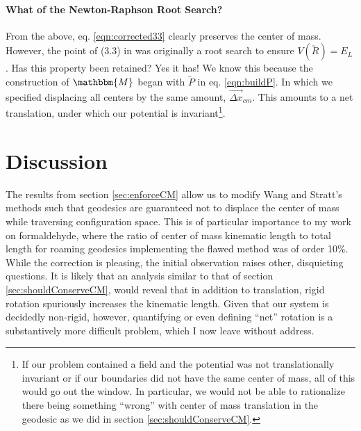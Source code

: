 \documentclass[letterpaper,12pt]{article}
\newcommand{\cvec}[1]{\utilde{#1}}
\newcommand{\svec}[1]{\vec{#1}}
\newcommand{\refeq}[1]{eq. \ref{eqn:#1}}
\begin{document}
\paragraph{What of the Newton-Raphson Root Search?} From the above, \refeq{corrected33} clearly preserves the center of mass. However, the point of (3.3) in \cite{wang:2007:geodesics} was originally a root search to ensure $V(\cvec{R}) = E_L$. Has this property been retained? Yes it has! We know this because the construction of $\mathbbm{M}$ began with $\cvec{P}$ in \refeq{buildP}. In which we specified displacing all centers by the same amount, $\svec{\Delta x}_{cm}$. This amounts to a net translation, under which our potential is invariant\footnote{If our problem contained a field and the potential was not translationally invariant or if our boundaries did not have the same center of mass, all of this would go out the window. In particular, we would not be able to rationalize there being something ``wrong'' with center of mass translation in the geodesic as we did in section \ref{sec:shouldConserveCM}.}.


\section{Discussion}
The results from section \ref{sec:enforceCM} allow us to modify Wang and Stratt's methods such that geodesics are guaranteed not to displace the center of mass while traversing configuration space. This is of particular importance to my work on formaldehyde, where the ratio of center of mass kinematic length to total length for roaming geodesics implementing the flawed method was of order 10\%.  While the correction is pleasing, the initial observation raises other, disquieting questions. It is likely that an analysis similar to that of section \ref{sec:shouldConserveCM}, would reveal that in addition to translation, rigid rotation spuriously increases the kinematic length. Given that our system is decidedly non-rigid, however, quantifying or even defining ``net'' rotation is a substantively more difficult problem, which I now leave without address. 



\end{document}
